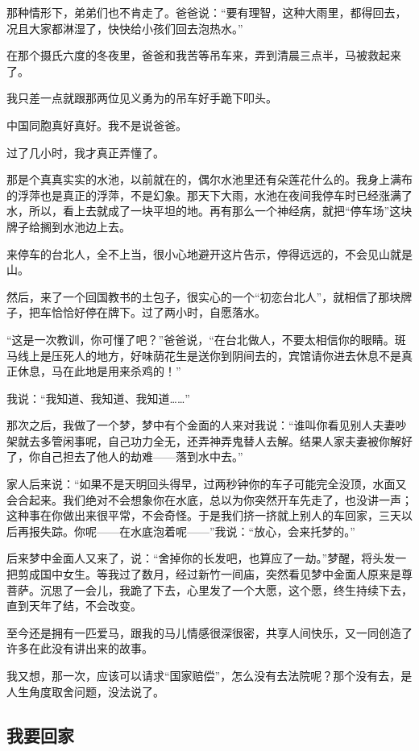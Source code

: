 \par 那种情形下，弟弟们也不肯走了。爸爸说：“要有理智，这种大雨里，都得回去，况且大家都淋湿了，快快给小孩们回去泡热水。”
\par 在那个摄氏六度的冬夜里，爸爸和我苦等吊车来，弄到清晨三点半，马被救起来了。
\par 我只差一点就跟那两位见义勇为的吊车好手跪下叩头。
\par 中国同胞真好真好。我不是说爸爸。
\par 过了几小时，我才真正弄懂了。
\par 那是个真真实实的水池，以前就在的，偶尔水池里还有朵莲花什么的。我身上满布的浮萍也是真正的浮萍，不是幻象。那天下大雨，水池在夜间我停车时已经涨满了水，所以，看上去就成了一块平坦的地。再有那么一个神经病，就把“停车场”这块牌子给搁到水池边上去。
\par 来停车的台北人，全不上当，很小心地避开这片告示，停得远远的，不会见山就是山。
\par 然后，来了一个回国教书的土包子，很实心的一个“初恋台北人”，就相信了那块牌子，把车恰恰好停在牌下。过了两小时，自愿落水。
\par “这是一次教训，你可懂了吧？”爸爸说，“在台北做人，不要太相信你的眼睛。斑马线上是压死人的地方，好味荫花生是送你到阴间去的，宾馆请你进去休息不是真正休息，马在此地是用来杀鸡的！”
\par 我说：“我知道、我知道、我知道……”
\par 那次之后，我做了一个梦，梦中有个金面的人来对我说：“谁叫你看见别人夫妻吵架就去多管闲事呢，自己功力全无，还弄神弄鬼替人去解。结果人家夫妻被你解好了，你自己担去了他人的劫难——落到水中去。”
\par 家人后来说：“如果不是天明回头得早，过两秒钟你的车子可能完全没顶，水面又会合起来。我们绝对不会想象你在水底，总以为你突然开车先走了，也没讲一声；这种事在你做出来很平常，不会奇怪。于是我们挤一挤就上别人的车回家，三天以后再报失踪。你呢——在水底泡着呢——”我说：“放心，会来托梦的。”
\par 后来梦中金面人又来了，说：“舍掉你的长发吧，也算应了一劫。”梦醒，将头发一把剪成国中女生。等我过了数月，经过新竹一间庙，突然看见梦中金面人原来是尊菩萨。沉思了一会儿，我跪了下去，心里发了一个大愿，这个愿，终生持续下去，直到天年了结，不会改变。
\par 至今还是拥有一匹爱马，跟我的马儿情感很深很密，共享人间快乐，又一同创造了许多在此没有讲出来的故事。
\par 我又想，那一次，应该可以请求“国家赔偿”，怎么没有去法院呢？那个没有去，是人生角度取舍问题，没法说了。


\subsection{我要回家}

